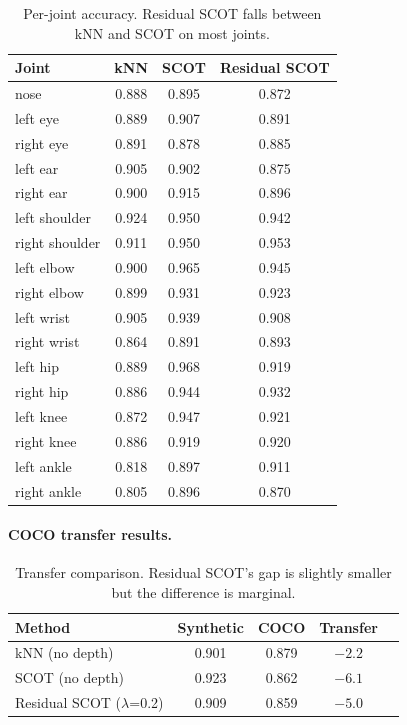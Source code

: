 \begin{table}[H]
\centering
\footnotesize
\begin{tabular}{lccc}
\toprule
Joint & kNN & SCOT & Residual SCOT \\
\midrule
nose & 0.888 & 0.895 & 0.872 \\
left eye & 0.889 & 0.907 & 0.891 \\
right eye & 0.891 & 0.878 & 0.885 \\
left ear & 0.905 & 0.902 & 0.875 \\
right ear & 0.900 & 0.915 & 0.896 \\
left shoulder & 0.924 & 0.950 & 0.942 \\
right shoulder & 0.911 & 0.950 & 0.953 \\
left elbow & 0.900 & 0.965 & 0.945 \\
right elbow & 0.899 & 0.931 & 0.923 \\
left wrist & 0.905 & 0.939 & 0.908 \\
right wrist & 0.864 & 0.891 & 0.893 \\
left hip & 0.889 & 0.968 & 0.919 \\
right hip & 0.886 & 0.944 & 0.932 \\
left knee & 0.872 & 0.947 & 0.921 \\
right knee & 0.886 & 0.919 & 0.920 \\
left ankle & 0.818 & 0.897 & 0.911 \\
right ankle & 0.805 & 0.896 & 0.870 \\
\bottomrule
\end{tabular}
\caption{Per-joint accuracy. Residual SCOT falls between kNN and SCOT on most joints.}
\end{table}

\paragraph{COCO transfer results.}

\begin{table}[H]
\centering
\footnotesize
\begin{tabular}{lcccc}
\toprule
Method & Synthetic & COCO & Transfer \\
\midrule
kNN (no depth) & 0.901 & 0.879 & $-2.2$ \\
SCOT (no depth) & 0.923 & 0.862 & $-6.1$ \\
Residual SCOT ($\lambda$=0.2) & 0.909 & 0.859 & $-5.0$ \\
\bottomrule
\end{tabular}
\caption{Transfer comparison. Residual SCOT's gap is slightly smaller but the difference is marginal.}
\end{table}

